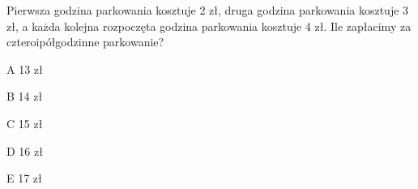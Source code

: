 \begin{tresc}
Pierwsza godzina parkowania kosztuje 2 zł, druga godzina parkowania kosztuje 3 zł, a każda kolejna rozpoczęta godzina parkowania kosztuje 4 zł. Ile zapłacimy za czteroipółgodzinne parkowanie?
\end{tresc}
\begin{wariant}{A} 13 zł \end{wariant}
\begin{wariant}{B} 14 zł \end{wariant}
\begin{wariant}{C} 15 zł \end{wariant}
\begin{wariant}{D} 16 zł \end{wariant}
\begin{wariant}{E} 17 zł \end{wariant}

